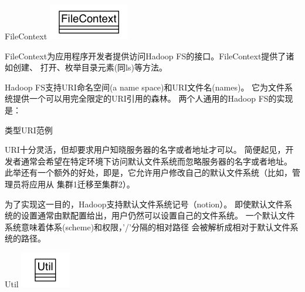 \begin{XeClass}{FileContext}
\includegraphics[width=\textwidth]{cdig/FileContext.png}
     
 FileContext为应用程序开发者提供访问Hadoop FS的接口。FileContext提供了诸如创建、
 打开、枚举目录元素(同ls)等方法。
 
 Hadoop FS支持URI命名空间(a name space)和URI文件名(names)。
 它为文件系统提供一个可以用完全限定的URI引用的森林。
 两个人通用的Hadoop FS的实现是：
 \begin{XeDuoLineTabular}{类型}{URI范例}
 \end{XeDuoLineTabular}
 
 URI十分灵活，但却要求用户知晓服务器的名字或者地址才可以。
 简便起见，开发者通常会希望在特定环境下访问默认文件系统而忽略服务器的名字或者地址。
 此举还有一个额外的好处，即是，它允许用户修改自己的默认文件系统（比如，管理员将应用从
 集群1迁移至集群2）。
 
 为了实现这一目的，Hadoop支持默认文件系统记号（notion）。
 即使默认文件系统的设置通常由默配置给出，用户仍然可以设置自己的文件系统。
 一个默认文件系统意味着体系(scheme)和权限，'/'分隔的相对路径
 会被解析成相对于默认文件系统的路径。

    \begin{XeInnerClass}{Util}
\includegraphics[width=\textwidth]{cdig/Util.png}
         

\end{XeInnerClass}
\end{XeClass}
